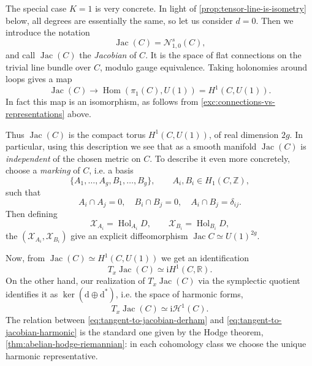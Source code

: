 \documentclass[12pt,letterpaper,reqno]{article}
\numberwithin{equation}{section}
\newcommand{\cN}{\ensuremath{\mathcal N}}
\newcommand{\cH}{\ensuremath{\mathcal H}}
\newcommand{\cX}{\ensuremath{\mathcal X}}
\newcommand{\R}{\ensuremath{\mathbb R}}
\newcommand{\Z}{\ensuremath{\mathbb Z}}
\newcommand{\I}{{\mathrm i}}
\newcommand{\de}{\mathrm{d}}
\newcommand{\ti}[1]{\textit{#1}}
\DeclareMathOperator{\Hom}{Hom}
\DeclareMathOperator{\Jac}{Jac}
\DeclareMathOperator{\Hol}{Hol}
\begin{document}
\begin{example}[Jacobians] \label{exa:jacobians}
The special case $K=1$ is very concrete. In light of 
\autoref{prop:tensor-line-is-isometry} below, all degrees are
essentially the same, so let us consider $d=0$. Then we
introduce the notation
\begin{equation}
 \Jac(C) = \cN^s_{1,0}(C),
\end{equation}
and call $\Jac(C)$ the \ti{Jacobian} of $C$.
It is the space of flat connections on the trivial line
bundle over $C$, modulo gauge equivalence.
Taking holonomies around loops gives a map
\begin{equation}
  \Jac(C) \to \Hom(\pi_1(C), U(1)) = H^1(C, U(1)).
\end{equation}
In fact this map is an isomorphism, as follows from
\autoref{exc:connections-vs-representations} above.

Thus $\Jac(C)$ is the compact torus $H^1(C,U(1))$,
of real dimension $2g$.
In particular, using this description we see that 
as a smooth manifold $\Jac(C)$
is \ti{independent} of the chosen metric on $C$.
To describe it even more concretely, choose a 
\ti{marking} of $C$, i.e. a basis 
\begin{equation}
	\{A_1, \dots, A_g, B_1, \dots, B_g \}, \qquad A_i, B_i \in H_1(C,\Z),
\end{equation}
such that
\begin{equation}
	A_i \cap A_j = 0, \quad B_i \cap B_j = 0, \quad A_i \cap B_j = \delta_{ij}.
\end{equation}
Then defining
\begin{equation}
	\cX_{A_i} = \Hol_{A_i} D, \qquad \cX_{B_i} = \Hol_{B_i} D,
\end{equation}
the $(\cX_{A_i},\cX_{B_i})$ give an explicit diffeomorphism $\Jac C \simeq U(1)^{2g}$.

Now, from $\Jac(C) \simeq H^1(C,U(1))$
we get an identification
\begin{equation} \label{eq:tangent-to-jacobian-derham}
 T_x \Jac(C) \simeq \I H^1(C,\R).
\end{equation}
On the other hand, our realization of $T_x \Jac(C)$ via the symplectic quotient
identifies it as $\ker (\de \oplus \de^*)$, i.e. 
the space of harmonic forms,
\begin{equation} \label{eq:tangent-to-jacobian-harmonic}
 T_x \Jac(C) \simeq \I \cH^1(C).
\end{equation}
The relation between \eqref{eq:tangent-to-jacobian-derham}
and \eqref{eq:tangent-to-jacobian-harmonic}
is the standard one given by the Hodge theorem,
\autoref{thm:abelian-hodge-riemannian}:
in each cohomology class we choose the unique 
harmonic representative.


\end{example}
\end{document}
